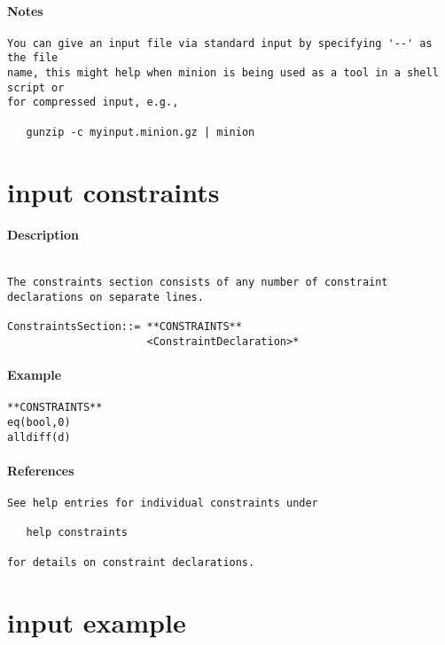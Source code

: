 \paragraph{Notes}
{\footnotesize
\begin{verbatim}
You can give an input file via standard input by specifying '--' as the file
name, this might help when minion is being used as a tool in a shell script or
for compressed input, e.g.,

   gunzip -c myinput.minion.gz | minion
\end{verbatim}
}
\section{input constraints}
\paragraph{Description}
{\footnotesize
\begin{verbatim}

The constraints section consists of any number of constraint
declarations on separate lines.

ConstraintsSection::= **CONSTRAINTS**
                      <ConstraintDeclaration>*
\end{verbatim}
}
\paragraph{Example}
{\footnotesize
\begin{verbatim}
**CONSTRAINTS**
eq(bool,0)
alldiff(d)
\end{verbatim}
}
\paragraph{References}
{\footnotesize
\begin{verbatim}
See help entries for individual constraints under

   help constraints

for details on constraint declarations.
\end{verbatim}
}
\section{input example}
